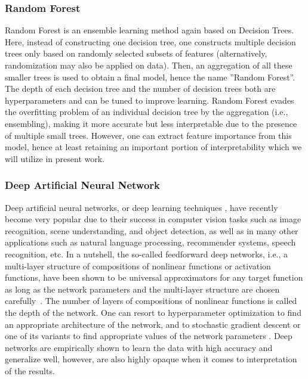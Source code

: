 \documentclass[sigconf]{acmart}
\begin{document}
\subsubsection{Random Forest}
Random Forest \cite{hastie2009elements, liaw2002classification, breiman2001random} is an ensemble learning method again based on Decision Trees. Here, instead of constructing one decision tree, one constructs multiple decision trees only based on randomly selected subsets of features (alternatively, randomization may also be applied on data). Then, an aggregation of all these smaller trees is used to obtain a final model, hence the name ''Random Forest''. The depth of each decision tree and the number of decision trees both are hyperparameters and can be tuned to improve learning. Random Forest evades the overfitting problem of an individual decision tree by the aggregation (i.e., ensembling), making it more accurate but less interpretable due to the presence of multiple small trees. However, one can extract feature importance from this model, hence at least retaining an important portion of interpretability which we will utilize in present work.

\subsubsection{Deep Artificial Neural Network}
Deep artificial neural networks, or deep learning techniques \cite{cybenko1989approximation,hornik1989multilayer, lecun2015deep, bengio2015deep}, have recently become very popular due to their success in computer vision tasks such as image recognition, scene understanding, and object detection, as well as in many other applications such as natural language processing, recommender systems, speech recognition, etc. In a nutshell, the so-called feedforward deep networks, i.e., a multi-layer structure of compositions of nonlinear functions or activation functions, have been shown to be universal approximators for any target function as long as the network parameters and the multi-layer structure are chosen carefully~\cite{cybenko1989approximation,hornik1989multilayer}. The number of layers of compositions of nonlinear functions is called the depth of the network. One can resort to  hyperparameter optimization to find an appropriate architecture of the network, and to stochastic gradient descent or one of its variants to find appropriate values of the network parameters \cite{bengio2015deep}. Deep networks are empirically shown to learn the data with high accuracy and generalize well, however, are also highly opaque when it comes to interpretation of the results. 
\end{document}
